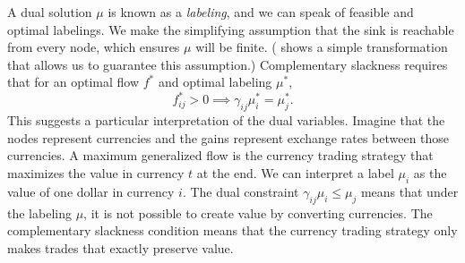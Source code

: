 \documentclass[11pt]{article}
\theoremstyle{definition}
\theoremstyle{definition}
\theoremstyle{definition}
\begin{document}
	A dual solution $\mu$ is known as a \emph{labeling}, and we can speak of feasible and 
	optimal labelings.
    We make the simplifying assumption that the sink is
	reachable from every node, which ensures $\mu$ will be finite. (\cite{Olver2017} shows a simple transformation that allows us to guarantee this assumption.) 
	Complementary slackness requires that for an optimal flow $f^*$ and optimal labeling $\mu^*$,
    \begin{equation}\label{eqn.cs} \tag{CS}
    f^*_{ij} > 0 \implies \gamma_{ij}\mu^*_i = \mu^*_j.
    \end{equation}
	This suggests a particular interpretation of the dual variables. Imagine that
	the nodes represent currencies and the gains represent exchange rates between those currencies.
	A maximum generalized flow is the currency trading strategy that maximizes the value in currency
	$t$ at the end. We can interpret a label $\mu_i$ as the value of one dollar in currency $i$.
	The dual constraint $\gamma_{ij} \mu_i \leq \mu_j$ means that under the labeling $\mu$,
	it is not possible to create value by converting currencies.
	The complementary slackness condition means that the currency trading strategy
	only makes trades that exactly preserve value.
	
\end{document}
